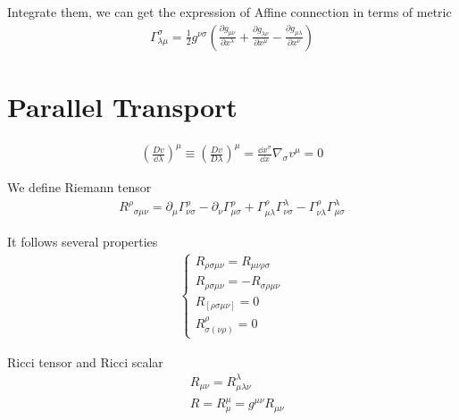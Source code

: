 Integrate them, we can get the expression of Affine connection in terms of metric
\begin{align}
    \Gamma^{\sigma}_{\lambda\mu}=\frac{1}{2}g^{\nu \sigma}\left(\frac{\partial g_{\mu\nu}}{\partial x^{\lambda}}+\frac{\partial g_{\lambda \nu}}{\partial x^{\mu}}-\frac{\partial g_{\mu\lambda}}{\partial x^{\nu}}\right)
\end{align}



\section{Parallel Transport}

\begin{align}
    \left(\frac{D v}{\dd \lambda}\right)^{\mu}\equiv \left(\frac{D v}{D \lambda}\right)^{\mu}=\frac{\dd x^{\sigma}}{\dd{x}}\nabla_{\sigma}v^{\mu}=0
\end{align}

We define Riemann tensor
\begin{align}
    {R^{\rho}}_{\sigma\mu\nu}=\partial _{\mu} \Gamma^{\rho}_{\nu\sigma}-\partial_{\nu}\Gamma^{\rho} _{\mu \sigma}+\Gamma^{\rho}_{\mu\lambda}\Gamma^{\lambda} _{\nu \sigma}-\Gamma^{\rho}_{\nu\lambda} \Gamma^{\lambda} _{\mu \sigma}
\end{align}

It follows several properties
\begin{align}
    \begin{cases}
        R_{\rho\sigma\mu\nu}=R_{\mu\nu\rho \sigma}\\
        R_{\rho \sigma \mu\nu}=-R_{\sigma\rho\mu\nu}\\
        R_{[\rho\sigma\mu\nu]}=0\\
        R^{\rho}_{\sigma(\nu \rho)}=0
    \end{cases}
\end{align}

Ricci tensor and Ricci scalar
\begin{align}
    &R_{\mu\nu}=R^{\lambda}_{\mu\lambda \nu}\\
    &R=R^{\mu}_\mu=g^{\mu\nu}R_{\mu\nu}
\end{align}

